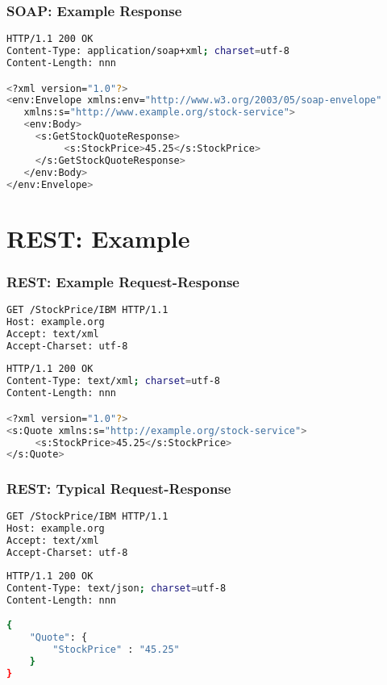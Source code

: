 \documentclass{beamer}
\begin{document}
\begin{frame}[fragile]\frametitle{SOAP: Example Response} 

  \begin{lstlisting}[language=bash, escapechar={^}]
HTTP/1.1 200 OK
Content-Type: application/soap+xml; charset=utf-8
Content-Length: nnn

<?xml version="1.0"?>
<env:Envelope xmlns:env="http://www.w3.org/2003/05/soap-envelope"
   xmlns:s="http://www.example.org/stock-service">
   <env:Body>
     <s:GetStockQuoteResponse>
          <s:StockPrice>45.25</s:StockPrice>
     </s:GetStockQuoteResponse>
   </env:Body>
</env:Envelope>
  \end{lstlisting}
  
\end{frame}




\section{REST: Example} 
\begin{frame}[fragile]\frametitle{REST: Example Request-Response} 

  \begin{lstlisting}[language=bash, escapechar={^}]
GET /StockPrice/IBM HTTP/1.1
Host: example.org
Accept: text/xml
Accept-Charset: utf-8
  \end{lstlisting}

  \begin{lstlisting}[language=bash, escapechar={^}]
HTTP/1.1 200 OK
Content-Type: text/xml; charset=utf-8
Content-Length: nnn

<?xml version="1.0"?>
<s:Quote xmlns:s="http://example.org/stock-service">
     <s:StockPrice>45.25</s:StockPrice>
</s:Quote>
  \end{lstlisting}
  
\end{frame}



\begin{frame}[fragile]\frametitle{REST: Typical Request-Response} 

  \begin{lstlisting}[language=bash, escapechar={^}]
GET /StockPrice/IBM HTTP/1.1
Host: example.org
Accept: text/xml
Accept-Charset: utf-8
  \end{lstlisting}
  
  \begin{lstlisting}[language=bash, escapechar={^}]
HTTP/1.1 200 OK
Content-Type: text/json; charset=utf-8
Content-Length: nnn

{ 
    "Quote": {
        "StockPrice" : "45.25"
    }
}
  \end{lstlisting}

\end{frame}
\end{document}
